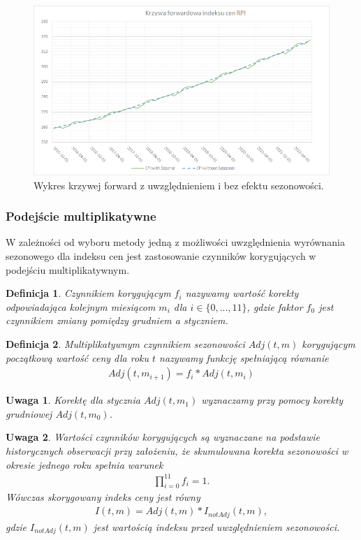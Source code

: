 \documentclass{mini}
\theoremstyle{mythstyle}
\newtheorem{Definicja}{Definicja}[chapter]
\newtheorem{Uwaga}{Uwaga}[chapter]
\begin{document}
	\begin{figure} [!h]
		\centering
		\includegraphics[scale=0.75]{graphics/rpi.png}
		\caption{Wykres krzywej forward z uwzględnieniem i bez efektu sezonowości.}
	\end{figure}
		
	\subsubsection*{Podejście multiplikatywne}
		W zależności od wyboru metody jedną z możliwości uwzględnienia wyrównania sezonowego dla indeksu cen jest zastosowanie czynników korygujących w podejściu multiplikatywnym.
		
	\begin{Definicja}
		Czynnikiem korygującym $f_i$ nazywamy wartość korekty odpowiadająca kolejnym miesiącom $m_i$ dla $i \in \{0,...,11\}$, gdzie faktor $f_0$ jest czynnikiem zmiany pomiędzy grudniem a styczniem.\\
	\end{Definicja}
	
	\begin{Definicja}
		Multiplikatywnym czynnikiem sezonowości $Adj(t,m)$ korygującym początkową wartość ceny dla roku $t$ nazywamy funkcję spełniającą równanie
		\begin{eqnarray*}
			Adj(t, m_{i+1})  = f_i * Adj(t, m_i)
		\end{eqnarray*}
	\end{Definicja}

	\begin{Uwaga}
		Korektę dla stycznia $Adj(t, m_1)$ wyznaczamy przy pomocy korekty grudniowej $Adj(t, m_0)$.\\
	\end{Uwaga}

	\begin{Uwaga}
		 Wartości czynników korygujących są wyznaczane na podstawie historycznych obserwacji przy założeniu, że skumulowana korekta sezonowości w okresie jednego roku spełnia warunek
		\begin{eqnarray*}
			\prod_{i=0}^{11} f_i = 1.
		\end{eqnarray*}
		Wówczas skorygowany indeks ceny jest równy
		\begin{eqnarray*}
			I(t,m) = Adj(t,m) * I_{notAdj}(t,m),
		\end{eqnarray*}
		gdzie $I_{notAdj}(t,m)$ jest wartością indeksu przed uwzględnieniem sezonowości.\\
	\end{Uwaga}
		
\end{document}
